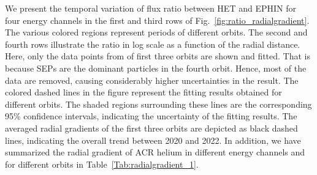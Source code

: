 We present the temporal variation of flux ratio between \ac{HET} and \ac{EPHIN} for four energy channels in the first and third rows of Fig.~\ref{fig:ratio_radialgradient}. The various colored regions represent periods of different orbits. The second and fourth rows illustrate the ratio in log scale as a function of the radial distance. Here, only the data points from of first three orbits are shown and fitted. That is because \acp{SEP} are the dominant particles in the fourth orbit. Hence, most of the data are removed, causing considerably higher uncertainties in the result. The colored dashed lines in the figure represent the fitting results obtained for different orbits. The shaded regions surrounding these lines are the corresponding 95\% confidence intervals,  indicating the uncertainty of the fitting results. The averaged radial gradients of the first three orbits are depicted as black dashed lines, indicating the overall trend between 2020 and 2022.
In addition, we have summarized the radial gradient of \ac{ACR} helium in different energy channels and for different orbits in Table~\ref{Tab:radialgradient_1}.

